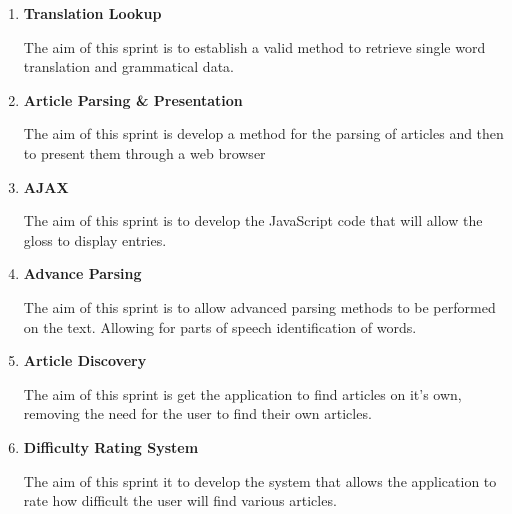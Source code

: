 \begin{enumerate}
	\item \textbf{Translation Lookup}
	
	The aim of this sprint is to establish a valid method to retrieve single word translation and grammatical data.
	
	\item \textbf{Article Parsing \& Presentation}
	
	The aim of this sprint is develop a method for the parsing of articles and then to present them through a web browser
	
	\item \textbf{AJAX}
	
	The aim of this sprint is to develop the JavaScript code that will allow the gloss to display entries.
	
	\item \textbf{Advance Parsing}
	
	The aim of this sprint is to allow advanced parsing methods to be performed on the text. Allowing for parts of speech identification of words. 
	
	\item \textbf{Article Discovery}
	
	The aim of this sprint is get the application to find articles on it's own, removing the need for the user to find their own articles.
	
	\item \textbf{Difficulty Rating System}
	
	The aim of this sprint it to develop the system that allows the application to rate how difficult the user will find various articles. 
	
\end{enumerate}
